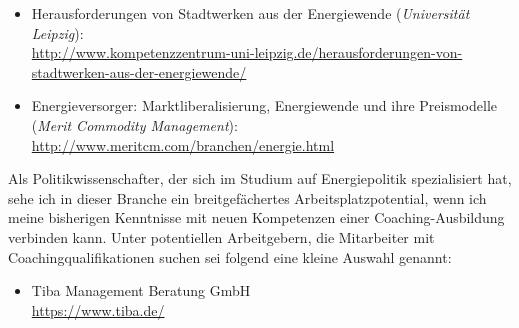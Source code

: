 \documentclass[11pt,a4paper]{article}
\begin{document}
	\begin{itemize}
	\item Herausforderungen von Stadtwerken aus der Energiewende (\textsl{Universität Leipzig}):\\
	\textsf{\textcolor{MidnightBlue}{\url{http://www.kompetenzzentrum-uni-leipzig.de/herausforderungen-von-stadtwerken-aus-der-energiewende/}}}
	\item Energieversorger: Marktliberalisierung, Energiewende und ihre Preismodelle (\textsl{Merit Commodity Management}):\\
	\textsf{\textcolor{MidnightBlue}{\url{http://www.meritcm.com/branchen/energie.html}}}
	\end{itemize}
	
Als Politikwissenschafter, der sich im Studium auf Energiepolitik spezialisiert hat, sehe ich in dieser Branche ein breitgefächertes Arbeitsplatzpotential, wenn ich meine bisherigen Kenntnisse mit neuen Kompetenzen einer Coaching-Ausbildung verbinden kann. Unter potentiellen Arbeitgebern, die Mitarbeiter mit Coachingqualifikationen suchen sei folgend eine kleine Auswahl genannt:

	\begin{itemize}
	\item Tiba Management Beratung GmbH\\
	\textsf{\textcolor{MidnightBlue}{\url{https://www.tiba.de/}}} 
	\end{itemize}
\end{document}

